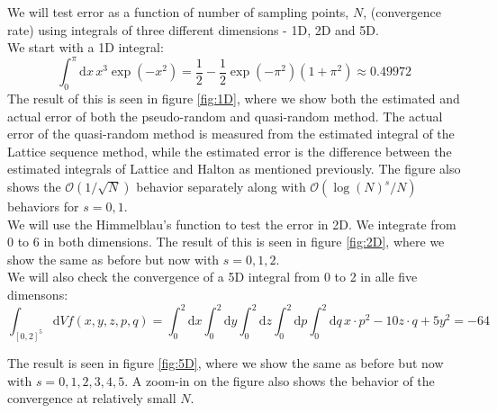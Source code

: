 \documentclass{article}
\begin{document}
We will test error as a function of number of sampling points, $N$, (convergence rate) using integrals
of three different dimensions - 1D, 2D and 5D. 
\\

We start with a 1D integral:
\begin{equation}
        \int_0^{\pi} \mathrm{d}x\, x^3\exp(-x^2) = 
\frac{1}{2}-\frac{1}{2}\exp(-\pi^2)(1+\pi^2)\approx0.49972
\end{equation}
The result of this is seen in figure \ref{fig:1D}, where we show both the estimated and
actual error of both the pseudo-random and quasi-random method. The actual error of the
quasi-random method is measured from the estimated integral of the Lattice sequence method,
while the estimated error is the difference between the estimated integrals of Lattice and
Halton as mentioned previously. The figure also shows the $\mathcal{O}(1/\sqrt{N})$ behavior
separately along with $\mathcal{O}(\log(N)^s/N)$ behaviors for $s=0,1$.
\\

We will use the Himmelblau's function to test the error in 2D. We integrate from 0 to 6
in both dimensions. The result of this is seen in figure \ref{fig:2D}, 
where we show the same as before but now with $s=0,1,2$.
\\

We will also check the convergence of a 5D integral from 0 to 2 in alle five dimensons:
\begin{equation}
	\int_{[0,2]^5} \mathrm{d}V f(x,y,z,p,q) = \int_0^2 \mathrm{d}x \int_0^2 \mathrm{d}y \int_0^2 \mathrm{d}z
\int_0^2 \mathrm{d}p \int_0^2 \mathrm{d}q \, x\cdot p^2 -10 z\cdot q + 5y^2 = -64
\end{equation}

The result is seen in figure \ref{fig:5D}, where we show the same as before but now with $s=0,1,2,3,4,5$.
A zoom-in on the figure also shows the behavior of the convergence at relatively small $N$.
\\
\end{document}
